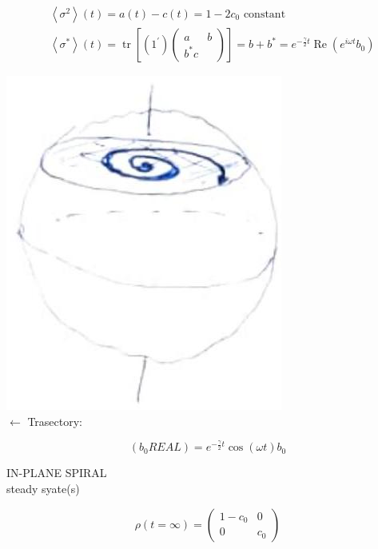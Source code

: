 \documentclass[10pt]{article}
\begin{document}
$$
\begin{aligned}
& \left\langle\sigma^{2}\right\rangle(t)=a(t)-c(t)=1-2 c_{0} \text { constant } \\
& \left\langle\sigma^{*}\right\rangle(t)=\operatorname{tr}\left[\left(1^{\prime}\right)\left(\begin{array}{ll}
a & b \\
b^{*} c
\end{array}\right)\right]=b+b^{*}=e^{-\frac{\gamma}{2} t} \operatorname{Re}\left(e^{i \omega t} b_{0}\right)
\end{aligned}
$$

\includegraphics[max width=\textwidth, center]{2025_10_16_1bd50d0393172dac5e59g-10}\\
$\leftarrow$ Trasectory:

$$
\left(b_{0} R E A L\right)=e^{-\frac{\gamma}{2} t} \cos (\omega t) b_{0}
$$

IN-PLANE SPIRAL\\
steady syate(s)

$$
\rho(t=\infty)=\left(\begin{array}{cc}
1-c_{0} & 0 \\
0 & c_{0}
\end{array}\right)
$$
\end{document}
